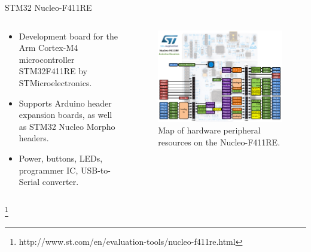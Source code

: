 \documentclass[
  aspectratio=169,
]{beamer}
\begin{document}
\begin{frame}{STM32 Nucleo-F411RE}
\begin{columns}[T] %
\hfill%

\begin{column}{.5\textwidth}
\begin{itemize}
\item Development board for the Arm Cortex-M4 microcontroller STM32F411RE by STMicroelectronics. 
\item Supports Arduino header expansion boards, as well as STM32 Nucleo Morpho headers.
\item Power, buttons, LEDs, programmer IC, USB-to-Serial converter.
\end{itemize}
\end{column}%
\hfill%
\begin{column}{.6\textwidth}
\vspace{-22mm}
\begin{figure}
\includegraphics[width=.9\textwidth,height=.9\textheight,keepaspectratio]{Nucleo_f411re.png}
\caption{Map of hardware peripheral resources on the Nucleo-F411RE.}
\end{figure}
\end{column}%
\end{columns}
\footnote{http://www.st.com/en/evaluation-tools/nucleo-f411re.html}
\end{frame}
\end{document}

